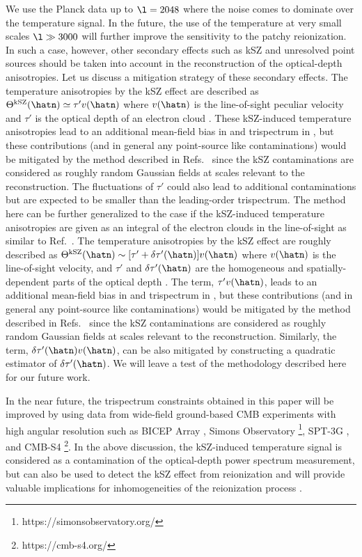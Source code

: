 \documentclass[aps,prd,twocolumn,superscriptaddress,groupedaddress,nofootinbib]{revtex4}
\def\T{\Theta}
\begin{document}
We use the Planck data up to $\l=2048$ where the noise comes to dominate over the temperature signal. 
In the future, the use of the temperature at very small scales $\l\gg 3000$ will further improve 
the sensitivity to the patchy reionization. In such a case, however, other secondary effects 
such as kSZ and unresolved point sources should be taken into account in the reconstruction of 
the optical-depth anisotropies. 
Let us discuss a mitigation strategy of these secondary effects. 
The temperature anisotropies by the kSZ effect are described as $\T^{\rm kSZ}(\hatn)
\simeq \tau'v(\hatn)$ where $v(\hatn)$ is the line-of-sight peculiar velocity and $\tau'$ is 
the optical depth of an electron cloud \cite{SZ:1980}. 
These kSZ-induced temperature anisotropies lead to an additional mean-field bias in  and 
trispectrum in , but these contributions 
(and in general any point-source like contaminations) would be mitigated by the method described in 
Refs.~\cite{Namikawa:2012,P13:phi,Osborne:2013nna} since the kSZ contaminations are considered 
as roughly random Gaussian fields at scales relevant to the reconstruction. 
The fluctuations of $\tau'$ could also lead to additional contaminations but are expected to be 
smaller than the leading-order trispectrum. 
The method here can be further generalized to the case if the kSZ-induced temperature 
anisotropies are given as an integral of the electron clouds in the line-of-sight as similar to 
Ref.~\cite{Dvorkin:2008tf}. 
\ifdefined \kSZall
The temperature anisotropies by the kSZ effect are roughly described as $\T^{\rm kSZ}(\hatn)
\sim [\tau'+\delta\tau'(\hatn)]v(\hatn)$ 
where $v(\hatn)$ is the line-of-sight velocity, and $\tau'$ and $\delta\tau'(\hatn)$ are 
the homogeneous and spatially-dependent parts of the optical depth \cite{SZ:1980}. 
The term, $\tau' v(\hatn)$, leads to an additional mean-field bias in  and 
trispectrum in , but these contributions 
(and in general any point-source like contaminations) would be mitigated by the method described in 
Refs.~\cite{Namikawa:2012,P13:phi,Osborne:2013nna} since the kSZ contaminations are considered 
as roughly random Gaussian fields at scales relevant to the reconstruction. 
Similarly, the term, $\delta\tau'(\hatn) v(\hatn)$, can be also mitigated by 
constructing a quadratic estimator of $\delta\tau'(\hatn)$. 
\fi
We will leave a test of the methodology described here for our future work.

In the near future, the trispectrum constraints obtained in this paper will be improved by using data from 
wide-field ground-based CMB experiments with high angular resolution such as 
BICEP Array \cite{BICEPArray}, Simons Observatory \footnote{https://simonsobservatory.org/}, 
SPT-3G \cite{SPT3G}, and CMB-S4 \footnote{https://cmb-s4.org/}. 
In the above discussion, the kSZ-induced temperature signal is considered 
as a contamination of the optical-depth power spectrum measurement, but can also be used to detect 
the kSZ effect from reionization and will provide valuable implications 
for inhomogeneities of the reionization process \cite{Smith:2016lnt}. 
\end{document}
